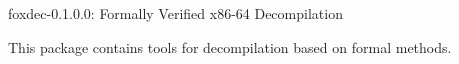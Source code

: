 \documentclass{book}
\begin{document}
\begin{titlepage}
\begin{haddocktitle}
foxdec-0.1.0.0: Formally Verified x86-64 Decompilation
\end{haddocktitle}
\begin{haddockprologue}
This package contains tools for decompilation based on formal methods.\par
\end{haddockprologue}
\end{titlepage}
\tableofcontents













\end{document}
